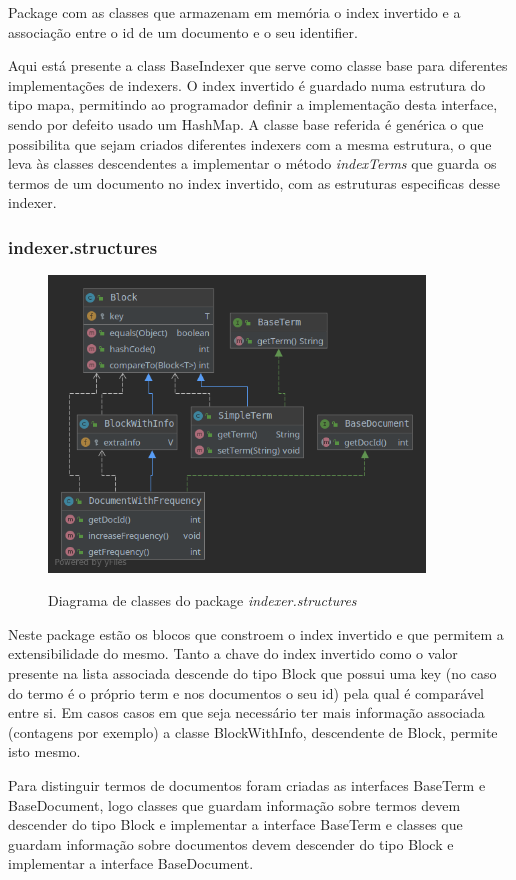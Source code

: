 \documentclass[12pt]{article}
\begin{document}
Package com as classes que armazenam em memória o index invertido e
a associação entre o id de um documento e o seu identifier.

Aqui está presente a class BaseIndexer que serve como classe base para
diferentes implementações de indexers. O index invertido é guardado numa
estrutura do tipo mapa, permitindo ao programador definir a implementação
desta interface, sendo por defeito usado um HashMap. A classe base referida
é genérica o que possibilita que sejam criados diferentes indexers com a
mesma estrutura, o que leva às classes descendentes a implementar o método
{\it indexTerms} que guarda os termos de um documento no index invertido,
com as estruturas especificas desse indexer.

\subsubsection{indexer.structures}
\begin{figure}[h]
  \center
  \includegraphics[width=10cm]{packages_indexer_structures.png}
  \label{fig:packages_indexer_structures}
  \caption{Diagrama de classes do package \it indexer.structures}
\end{figure}

Neste package estão os blocos que constroem o index invertido e que permitem
a extensibilidade do mesmo. Tanto a chave do index invertido como o valor presente
na lista associada descende do tipo Block que possui uma key (no caso do termo é o
próprio term e nos documentos o seu id) pela qual é comparável entre si. Em casos
casos em que seja necessário ter mais informação associada (contagens por exemplo)
a classe BlockWithInfo, descendente de Block, permite isto mesmo.

Para distinguir termos de documentos foram criadas as interfaces BaseTerm e BaseDocument,
logo classes que guardam informação sobre termos devem descender do tipo Block e
implementar a interface BaseTerm e classes que guardam informação sobre documentos
devem descender do tipo Block e implementar a interface BaseDocument.
\end{document}
